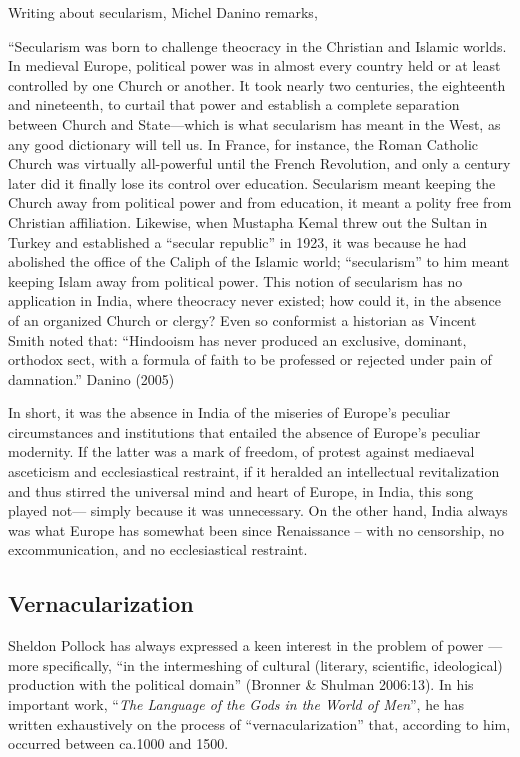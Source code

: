 Writing about secularism, Michel Danino remarks,
\begin{myquote}
“Secularism was born to challenge theocracy in the Christian and Islamic worlds. In medieval Europe, political power was in almost every country held or at least controlled by one Church or another. It took nearly two centuries, the eighteenth and nineteenth, to curtail that power and establish a complete separation between Church and State—which is what secularism has meant in the West, as any good dictionary will tell us. In France, for instance, the Roman Catholic Church was virtually all-powerful until the French Revolution, and only a century later did it finally lose its control over education. Secularism meant keeping the Church away from political power and from education, it meant a polity free from Christian affiliation. Likewise, when Mustapha Kemal threw out the Sultan in Turkey and established a “secular republic” in 1923, it was because he had abolished the office of the Caliph of the Islamic world; “secularism” to him meant keeping Islam away from political power.  This notion of secularism has no application in India, where theocracy never existed; how could it, in the absence of an organized Church or
clergy? Even so conformist a historian as Vincent Smith noted that: “Hindooism has never produced an exclusive, dominant, orthodox sect, with a formula of faith to be professed or rejected under pain of damnation.”	\hfill{Danino (2005)}
\end{myquote}

In short, it was the absence in India of the miseries of Europe’s peculiar circumstances and institutions that entailed the absence of Europe’s peculiar modernity. If the latter was a mark of freedom, of protest against mediaeval asceticism and ecclesiastical restraint, if it heralded an intellectual revitalization and thus stirred the universal mind and heart of Europe, in India, this song played not— simply because it was unnecessary. On the other hand, India always was what Europe has somewhat been since Renaissance – with no censorship, no excommunication, and no ecclesiastical restraint.

\subsection{Vernacularization}%

Sheldon Pollock has always expressed a keen interest in the problem of power — more specifically, “in the intermeshing of cultural (literary, scientific, ideological) production with the political domain” (Bronner \& Shulman 2006:13). In his important work, “{\em The Language of the Gods in the World of Men}”, he has written exhaustively on the process of “vernacularization” that, according to him, occurred between ca.1000 and 1500.

